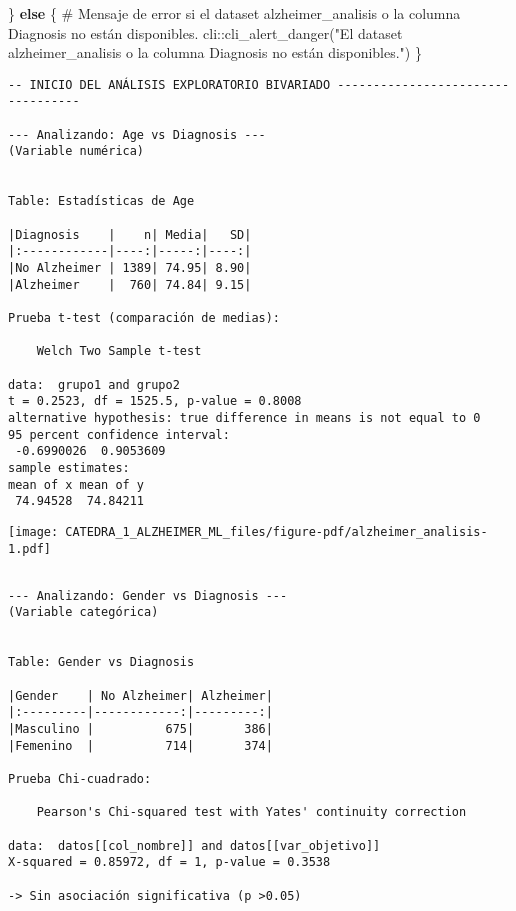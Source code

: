 \documentclass[
  letterpaper,
  DIV=11,
  numbers=noendperiod]{scrartcl}
\newenvironment{Shaded}{\begin{snugshade}}{\end{snugshade}}
\newcommand{\CommentTok}[1]{\textcolor[rgb]{0.37,0.37,0.37}{#1}}
\newcommand{\ControlFlowTok}[1]{\textcolor[rgb]{0.00,0.23,0.31}{\textbf{#1}}}
\newcommand{\FunctionTok}[1]{\textcolor[rgb]{0.28,0.35,0.67}{#1}}
\newcommand{\NormalTok}[1]{\textcolor[rgb]{0.00,0.23,0.31}{#1}}
\newcommand{\SpecialCharTok}[1]{\textcolor[rgb]{0.37,0.37,0.37}{#1}}
\newcommand{\StringTok}[1]{\textcolor[rgb]{0.13,0.47,0.30}{#1}}
\begin{document}
\begin{Shaded}
\begin{Highlighting}[]
\NormalTok{\} }\ControlFlowTok{else}\NormalTok{ \{}
  \CommentTok{\# Mensaje de error si el dataset \textquotesingle{}alzheimer\_analisis\textquotesingle{} o la columna \textquotesingle{}Diagnosis\textquotesingle{} no están disponibles.}
\NormalTok{  cli}\SpecialCharTok{::}\FunctionTok{cli\_alert\_danger}\NormalTok{(}\StringTok{"El dataset \textquotesingle{}alzheimer\_analisis\textquotesingle{} o la columna \textquotesingle{}Diagnosis\textquotesingle{} no están disponibles."}\NormalTok{)}
\NormalTok{\}}
\end{Highlighting}
\end{Shaded}

\begin{verbatim}
-- INICIO DEL ANÁLISIS EXPLORATORIO BIVARIADO ---------------------------------- 

--- Analizando: Age vs Diagnosis ---
(Variable numérica)


Table: Estadísticas de Age

|Diagnosis    |    n| Media|   SD|
|:------------|----:|-----:|----:|
|No Alzheimer | 1389| 74.95| 8.90|
|Alzheimer    |  760| 74.84| 9.15|

Prueba t-test (comparación de medias):

    Welch Two Sample t-test

data:  grupo1 and grupo2
t = 0.2523, df = 1525.5, p-value = 0.8008
alternative hypothesis: true difference in means is not equal to 0
95 percent confidence interval:
 -0.6990026  0.9053609
sample estimates:
mean of x mean of y 
 74.94528  74.84211 
\end{verbatim}

\begin{center}
\texttt{[image: CATEDRA\_1\_ALZHEIMER\_ML\_files/figure-pdf/alzheimer\_analisis-1.pdf]}
\end{center}

\begin{verbatim}

--- Analizando: Gender vs Diagnosis ---
(Variable categórica)


Table: Gender vs Diagnosis

|Gender    | No Alzheimer| Alzheimer|
|:---------|------------:|---------:|
|Masculino |          675|       386|
|Femenino  |          714|       374|

Prueba Chi-cuadrado:

    Pearson's Chi-squared test with Yates' continuity correction

data:  datos[[col_nombre]] and datos[[var_objetivo]]
X-squared = 0.85972, df = 1, p-value = 0.3538

-> Sin asociación significativa (p >0.05)
\end{verbatim}
\end{document}
